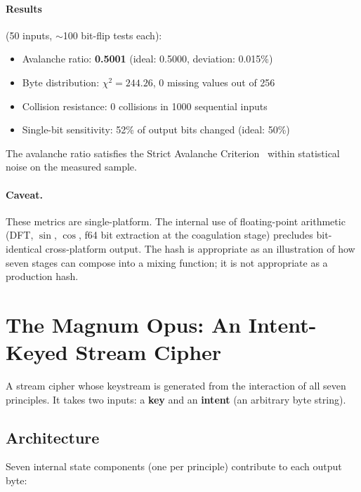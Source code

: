 \documentclass[sigplan,anonymous=false]{acmart}
\begin{document}
\paragraph{Results} (50 inputs, $\sim$100 bit-flip tests each):

\begin{itemize}[nosep]
  \item Avalanche ratio: \textbf{0.5001} (ideal: 0.5000, deviation: 0.015\%)
  \item Byte distribution: $\chi^2 = 244.26$, 0 missing values out of 256
  \item Collision resistance: 0 collisions in 1000 sequential inputs
  \item Single-bit sensitivity: 52\% of output bits changed (ideal: 50\%)
\end{itemize}

The avalanche ratio satisfies the Strict Avalanche Criterion~\cite{sac} within statistical noise on the measured sample.

\paragraph{Caveat.} These metrics are single-platform. The internal use of floating-point arithmetic (DFT, $\sin$, $\cos$, f64 bit extraction at the coagulation stage) precludes bit-identical cross-platform output. The hash is appropriate as an illustration of how seven stages can compose into a mixing function; it is not appropriate as a production hash.

\section{The Magnum Opus: An Intent-Keyed Stream Cipher}

A stream cipher whose keystream is generated from the interaction of all seven principles. It takes two inputs: a \textbf{key} and an \textbf{intent} (an arbitrary byte string).

\subsection{Architecture}

Seven internal state components (one per principle) contribute to each output byte:
\end{document}
